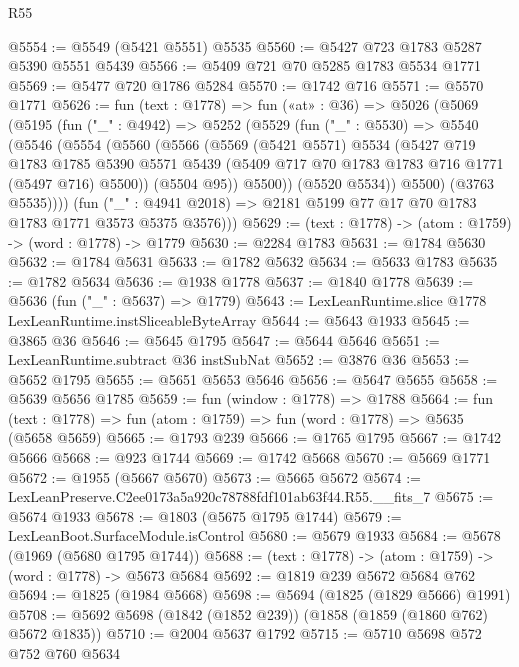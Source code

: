 \begin{lexlean}{R55}
\begin{coremodule}
@5554 := @5549 (@5421 @5551) @5535
@5560 := @5427 @723 @1783 @5287 @5390 @5551 @5439
@5566 := @5409 @721 @70 @5285 @1783 @5534 @1771
@5569 := @5477 @720 @1786 @5284
@5570 := @1742 @716
@5571 := @5570 @1771
@5626 := fun (text : @1778) =>
  fun («at» : @36) =>
  @5026
    (@5069
      (@5195
        (fun ("_" : @4942) =>
        @5252
          (@5529
            (fun ("_" : @5530) =>
            @5540
              (@5546
                (@5554
                  (@5560
                    (@5566
                      (@5569
                        (@5421 @5571)
                        @5534
                        (@5427
                          @719
                          @1783
                          @1785
                          @5390
                          @5571
                          @5439
                          (@5409 @717 @70 @1783 @1783 @716 @1771 (@5497 @716) @5500))
                        (@5504 @95))
                      @5500))
                  (@5520 @5534))
                @5500)
              (@3763 @5535))))
        (fun ("_" : @4941 @2018) => @2181 @5199 @77 @17 @70 @1783 @1783 @1771 @3573 @5375 @3576)))
@5629 := (text : @1778) -> (atom : @1759) -> (word : @1778) -> @1779
@5630 := @2284 @1783
@5631 := @1784 @5630
@5632 := @1784 @5631
@5633 := @1782 @5632
@5634 := @5633 @1783
@5635 := @1782 @5634
@5636 := @1938 @1778
@5637 := @1840 @1778
@5639 := @5636 (fun ("_" : @5637) => @1779)
@5643 := LexLeanRuntime.slice @1778 LexLeanRuntime.instSliceableByteArray
@5644 := @5643 @1933
@5645 := @3865 @36
@5646 := @5645 @1795
@5647 := @5644 @5646
@5651 := LexLeanRuntime.subtract @36 instSubNat
@5652 := @3876 @36
@5653 := @5652 @1795
@5655 := @5651 @5653 @5646
@5656 := @5647 @5655
@5658 := @5639 @5656 @1785
@5659 := fun (window : @1778) => @1788
@5664 := fun (text : @1778) => fun (atom : @1759) => fun (word : @1778) => @5635 (@5658 @5659)
@5665 := @1793 @239
@5666 := @1765 @1795
@5667 := @1742 @5666
@5668 := @923 @1744
@5669 := @1742 @5668
@5670 := @5669 @1771
@5672 := @1955 (@5667 @5670)
@5673 := @5665 @5672
@5674 := LexLeanPreserve.C2ee0173a5a920c78788fdf101ab63f44.R55.__fits_7
@5675 := @5674 @1933
@5678 := @1803 (@5675 @1795 @1744)
@5679 := LexLeanBoot.SurfaceModule.isControl
@5680 := @5679 @1933
@5684 := @5678 (@1969 (@5680 @1795 @1744))
@5688 := (text : @1778) -> (atom : @1759) -> (word : @1778) -> @5673 @5684
@5692 := @1819 @239 @5672 @5684 @762
@5694 := @1825 (@1984 @5668)
@5698 := @5694 (@1825 (@1829 @5666) @1991)
@5708 := @5692 @5698 (@1842 (@1852 @239)) (@1858 (@1859 (@1860 @762) @5672 @1835))
@5710 := @2004 @5637 @1792
@5715 := @5710 @5698 @572 @752 @760 @5634

\end{coremodule}
\end{lexlean}
